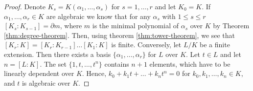 \begin{proof}
    Denote $K_s = K(\alpha_1, \dots, \alpha_s)$ for $s = 1, \dots, r$ and let $K_0 = K$. If \(\alpha_1, \dots , \alpha_r \in K\) are algebraic we know that for any \(\alpha_s\) with \(1 \leq s \leq r\) \( [K_s: K_{s-1}] = \partial m\), where \(m\) is the minimal polynomial of \(\alpha_s\) over \(K\) by Theorem \ref{thm:degree-theorem}. Then, using theorem \ref{thm:tower-theorem}, we see that \([K_r : K] = [K_r:K_{r-1}]\dots[K_1:K]\) is finite. Conversely, let \(L/K\) be a finite extension. Then there exists a basis \(\{\alpha_1, \dots, \alpha_r\}\) for \(L\) over \(K\). Let \(t \in L\)  and let \(n = [L:K]\). The set \(\{1,t,\dots,t^n\}\) contains \(n+1\) elements, which have to be linearly dependent over \(K\). Hence, \(k_0 + k_1 t + \dots + k_n t^n = 0\) for \(k_0, k_1, \dots, k_n \in K\), and \(t\) is algebraic over \(K\).
\end{proof}



